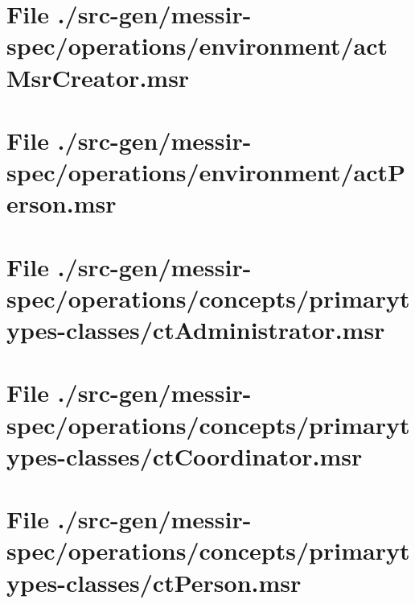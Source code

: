 \section[File /src-gen/messir-spec/operations/environment/actMsrCreator.msr]{File ./src-gen/messir-spec/operations/environment/actMsrCreator.msr}
\scriptsize

\normalsize
	
\section[File /src-gen/messir-spec/operations/environment/actPerson.msr]{File ./src-gen/messir-spec/operations/environment/actPerson.msr}
\scriptsize

\normalsize
	
\section[File /src-gen/messir-spec/operations/concepts.../ctAdministrator.msr]{File ./src-gen/messir-spec/operations/concepts/primarytypes-classes/ctAdministrator.msr}
\scriptsize

\normalsize
	
\section[File /src-gen/messir-spec/operations/concepts.../ctCoordinator.msr]{File ./src-gen/messir-spec/operations/concepts/primarytypes-classes/ctCoordinator.msr}
\scriptsize

\normalsize
	
\section[File /src-gen/messir-spec/operations/concepts/primarytypes-classes/ctPerson.msr]{File ./src-gen/messir-spec/operations/concepts/primarytypes-classes/ctPerson.msr}
\scriptsize

\normalsize
	
